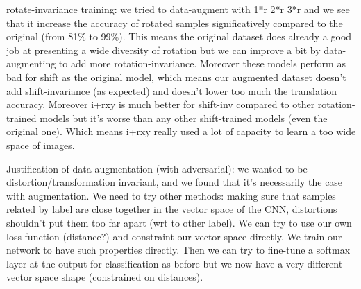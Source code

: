 \documentclass[a4paper,12pt]{article}
\begin{document}
rotate-invariance training: we tried to data-augment with 1*r 2*r 3*r and we see that it increase the accuracy of rotated samples significatively compared to the original (from 81\% to 99\%). This means the original dataset does already a good job at presenting a wide diversity of rotation but we can improve a bit by data-augmenting to add more rotation-invariance.
Moreover these models perform as bad for shift as the original model, which means our augmented dataset doesn't add shift-invariance (as expected) and doesn't lower too much the translation accuracy.
Moreover i+rxy is much better for shift-inv compared to other rotation-trained models but it's worse than any other shift-trained models (even the original one). Which means i+rxy really used a lot of capacity to learn a too wide space of images.

Justification of data-augmentation (with adversarial): we wanted to be distortion/transformation invariant, and we found that it's necessarily the case with augmentation. We need to try other methods: making sure that samples related by label are close together in the vector space of the CNN, distortions shouldn't put them too far apart (wrt to other label). We can try to use our own loss function (distance?) and constraint our vector space directly.
We train our network to have such properties directly. Then we can try to fine-tune a softmax layer at the output for classification as before but we now have a very different vector space shape (constrained on distances).
\end{document}
